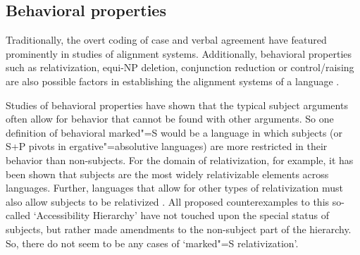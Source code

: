 
\subsection{Behavioral properties}\label{behavior} 

Traditionally, the overt coding of case and verbal agreement have featured prominently in studies of alignment systems. 
Additionally, behavioral properties such as relativization, equi-NP deletion, conjunction reduction or control/raising are also possible factors in establishing the alignment systems of a language \citep{Bickel.align}. 

Studies of behavioral properties have shown that the typical subject arguments often allow for behavior that cannot be found with other arguments.
So one definition of behavioral marked"=S would be a language in which subjects (or S+P pivots in ergative"=absolutive languages) are more restricted in their behavior than non-subjects.
For the domain of relativization, for example, it has been shown that subjects are the most widely relativizable elements across languages. 
Further, languages that allow for other types of relativization must also allow subjects to be relativized \citep{Keenan:1977}. 
All proposed counterexamples to this so-called `Accessibility Hierarchy'  have not touched upon the special status of subjects, but rather made amendments to the non-subject part of the hierarchy. 
So, there do not seem to be any cases of `marked"=S relativization'.

